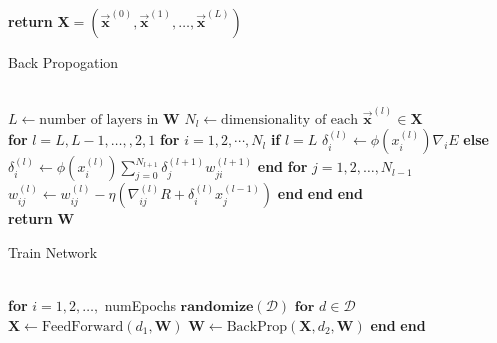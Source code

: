 \documentclass[prl,amsmath,amssymb,floatfix,superscriptaddress,notitlepage,twocolumn]{revtex4}
\newcommand{\vc}[1]{\vec{\mathbf{#1}}} 								%
\begin{document}
{\begin{algorithm}[H]
\begin{algorithmic}[]
\State \textbf{return} \textbf{X}$=(\vc x^{(0)},\vc x^{(1)},\dots,\vc x^{(L)})$\\
\EndProcedure
\end{algorithmic}
\end{algorithm}

\begin{algorithm}[H]
\caption{Back Propogation}\label{back_prop}
\begin{algorithmic}[]
\Procedure{BackProp}{\textbf{X}, $\vc y$, \textbf{W}}\\
\State $L \gets \text{number of layers in }\textbf{W}$
\State $N_l \gets \text{dimensionality of each } \vc x^{(l)} \in \textbf{X}$\\

\State \textbf{for} $l=L,L-1,\dots,,2,1$
\State \hspace{.25cm}\textbf{for} $i = 1,2,\cdots, N_l$
\State \hspace{.50cm}\textbf{if} $l=L$
\State \hspace{.75cm} $\delta^{(l)}_i \gets \phi(x_i^{(l)})\nabla_i E$
\State \hspace{.50cm}\textbf{else}
\State \hspace{.75cm} $\delta^{(l)}_i\gets \phi(x^{(l)}_i)\sum_{j=0}^{N_{l+1}}\delta^{(l+1)}_jw^{(l+1)}_{ji}$
\State \hspace{.50cm}\textbf{end}
\State \hspace{.50cm}\textbf{for} $j=1,2,\dots,N_{l-1}$
\State \hspace{.75cm}$w^{(l)}_{ij}\gets w^{(l)}_{ij}-\eta\left(\nabla^{(l)}_{ij}R+\delta^{(l)}_ix^{(l-1)}_j\right)$
\State \hspace{.50cm}\textbf{end}
\State \hspace{.25cm}\textbf{end}
\State \textbf{end}\\

\State \textbf{return} \textbf{W}\\
\EndProcedure
\end{algorithmic}
\end{algorithm}

\begin{algorithm}[H]
\caption{Train Network}\label{train_ANN}
\begin{algorithmic}[]
\\

\State \textbf{for} $i = 1, 2, \dots,$ numEpochs
\State \hspace{.25cm} $\textbf{randomize}(\mathcal{D})$ 
\State \hspace{.25cm} $\textbf{for } d\in\mathcal{D}$
\State \hspace{.50cm} $\textbf{X} \gets \text{FeedForward}(d_1,\textbf{W})$
\State \hspace{.50cm} $\textbf{W} \gets \text{BackProp}(\textbf{X}, d_2,\textbf{W})$
\State \hspace{.25cm} \textbf{end}
\State \textbf{end}\\


\end{algorithmic}
\end{algorithm}}
\end{document}

